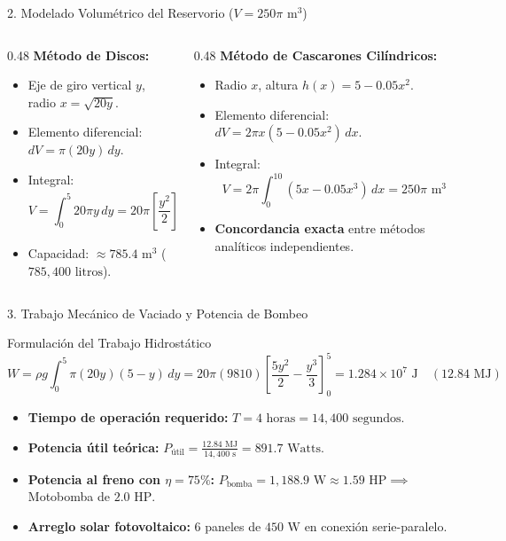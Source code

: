 \documentclass[
  spanish,
  aspectratio=169,
  xcolor={dvipsnames,table}
]{beamer}
\begin{document}
\begin{frame}{2. Modelado Volumétrico del Reservorio ($V = 250\pi\text{ m}^3$)}
  \begin{columns}[T]
    \begin{column}{0.48\textwidth}
      \textbf{\color{uanlblue}Método de Discos:}
      \begin{itemize}
        \item Eje de giro vertical $y$, radio $x = \sqrt{20y}$.
        \item Elemento diferencial: $dV = \pi (20y)\,dy$.
        \item Integral:
          $$V = \int_{0}^{5} 20\pi y\,dy = 20\pi \left[ \frac{y^2}{2} \right]_{0}^{5} = 250\pi\text{ m}^3$$
        \item Capacidad: $\approx 785.4\text{ m}^3$ ($785,400\text{ litros}$).
      \end{itemize}
    \end{column}
    \begin{column}{0.48\textwidth}
      \textbf{\color{uanlblue}Método de Cascarones Cilíndricos:}
      \begin{itemize}
        \item Radio $x$, altura $h(x) = 5 - 0.05 x^2$.
        \item Elemento diferencial: $dV = 2\pi x (5 - 0.05 x^2)\,dx$.
        \item Integral:
          $$V = 2\pi \int_{0}^{10} (5x - 0.05 x^3)\,dx = 250\pi\text{ m}^3$$
        \item \textbf{Concordancia exacta} entre métodos analíticos independientes.
      \end{itemize}
    \end{column}
  \end{columns}
\end{frame}

\begin{frame}{3. Trabajo Mecánico de Vaciado y Potencia de Bombeo}
  \begin{block}{Formulación del Trabajo Hidrostático}
    $$W = \rho g \int_{0}^{5} \pi (20y)(5 - y)\,dy = 20\pi (9810) \left[ \frac{5y^2}{2} - \frac{y^3}{3} \right]_{0}^{5} = 1.284 \times 10^7\text{ J} \quad (12.84\text{ MJ})$$
  \end{block}
  \begin{itemize}
    \item \textbf{Tiempo de operación requerido:} $T = 4\text{ horas} = 14,400\text{ segundos}$.
    \item \textbf{Potencia útil teórica:} $P_{\text{útil}} = \frac{12.84\text{ MJ}}{14,400\text{ s}} = 891.7\text{ Watts}$.
    \item \textbf{Potencia al freno con $\eta = 75\%$:} $P_{\text{bomba}} = 1,188.9\text{ W} \approx 1.59\text{ HP} \implies$ Motobomba de $2.0\text{ HP}$.
    \item \textbf{Arreglo solar fotovoltaico:} 6 paneles de $450\text{ W}$ en conexión serie-paralelo.
  \end{itemize}
\end{frame}
\end{document}
